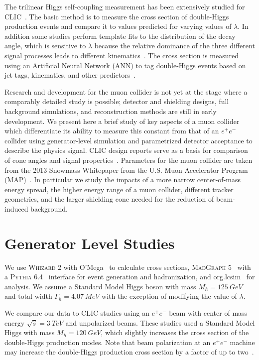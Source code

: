 \documentclass[12pt]{article}
\begin{document}
The trilinear Higgs self-coupling measurement has been extensively studied for CLIC~\cite{clic-physics,pres:jan}. The basic method is to measure the cross section of double-Higgs production events and compare it to values predicted for varying values of $\lambda$. In addition some studies perform template fits to the distribution of the decay angle, which is sensitive to $\lambda$ because the relative dominance of the three different signal processes leads to different kinematics~\cite{clic-physics}. The cross section is measured using an Artificial Neural Network (ANN) to tag double-Higgs events based on jet tags, kinematics, and other predictors~\cite{pres:jan}. 

Research and development for the muon collider is not yet at the stage where a comparably detailed study is possible; detector and shielding designs, full background simulations, and reconstruction methods are still in early development. We present here a brief study of key aspects of a muon collider which differentiate its ability to measure this constant from that of an $e^+e^-$ collider using generator-level simulation and parametrized detector acceptance to describe the physics signal. CLIC design reports serve as a basis for comparison of cone angles and signal properties~\cite{clic-physics,pres:jan}. Parameters for the muon collider are taken from the 2013 Snowmass Whitepaper from the U.S. Muon Accelerator Program (MAP)~\cite{usmap}. In particular we study the impacts of a more narrow center-of-mass energy spread, the higher energy range of a muon collider, different tracker geometries, and the larger shielding cone needed for the reduction of beam-induced background. 

\section{Generator Level Studies}
We use \textsc{Whizard 2} with O'Mega~\cite{whizard,omega} to calculate cross sections, \textsc{MadGraph 5}~\cite{madgraph} with a \textsc{Pythia 6.4}~\cite{pythia} interface for event generation and hadronization, and org.lcsim~\cite{lcsim} for analysis. We assume a Standard Model Higgs boson with mass $M_h = 125\ GeV$ and total width $\Gamma_h = 4.07\ MeV$ with the exception of modifying the value of $\lambda$.

We compare our data to CLIC studies using an $e^+e^-$ beam with center of mass energy $\sqrt{\hat{s}}=3~TeV$ and unpolarized beams. These studies used a Standard Model Higgs with mass $M_h=120~GeV$, which slightly increases the cross section of the double-Higgs production modes. Note that beam polarization at an $e^+e^-$ machine may increase the double-Higgs production cross section by a factor of up to two~\cite{pres:jan}.
\end{document}
